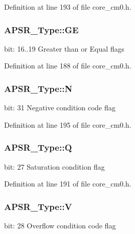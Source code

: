Definition at line 193 of file core\-\_\-cm0.\-h.

\hypertarget{union_a_p_s_r___type_adcb98a5b9c93b0cb69cdb7af5638f32e}{
\subsubsection[{G\-E}]{ A\-P\-S\-R\-\_\-\-Type\-::\-G\-E}}\label{union_a_p_s_r___type_adcb98a5b9c93b0cb69cdb7af5638f32e}
bit\-: 16..19 Greater than or Equal flags 

Definition at line 188 of file core\-\_\-cm0.\-h.

\hypertarget{union_a_p_s_r___type_a7e7bbba9b00b0bb3283dc07f1abe37e0}{
\subsubsection[{N}]{ A\-P\-S\-R\-\_\-\-Type\-::\-N}}\label{union_a_p_s_r___type_a7e7bbba9b00b0bb3283dc07f1abe37e0}
bit\-: 31 Negative condition code flag 

Definition at line 195 of file core\-\_\-cm0.\-h.

\hypertarget{union_a_p_s_r___type_a22d10913489d24ab08bd83457daa88de}{
\subsubsection[{Q}]{ A\-P\-S\-R\-\_\-\-Type\-::\-Q}}\label{union_a_p_s_r___type_a22d10913489d24ab08bd83457daa88de}
bit\-: 27 Saturation condition flag 

Definition at line 191 of file core\-\_\-cm0.\-h.

\hypertarget{union_a_p_s_r___type_a8004d224aacb78ca37774c35f9156e7e}{
\subsubsection[{V}]{ A\-P\-S\-R\-\_\-\-Type\-::\-V}}\label{union_a_p_s_r___type_a8004d224aacb78ca37774c35f9156e7e}
bit\-: 28 Overflow condition code flag 

